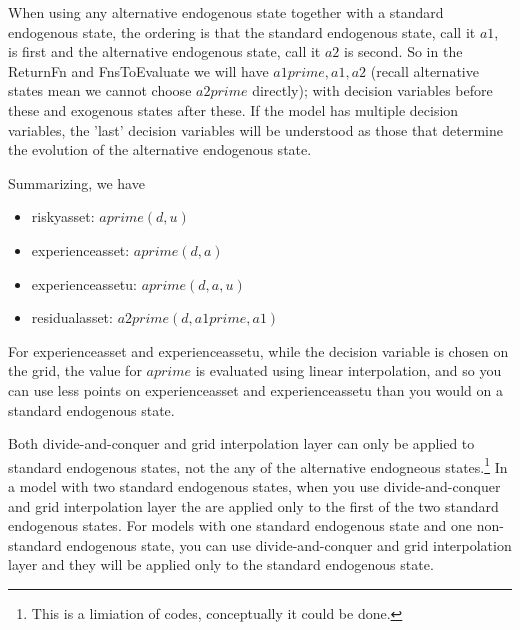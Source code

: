 When using any alternative endogenous state together with a standard endogenous state, the ordering is that the standard endogenous state, call it $a1$, is first and the alternative endogenous state, call it $a2$ is second. So in the ReturnFn and FnsToEvaluate we will have $a1prime,a1,a2$ (recall alternative states mean we cannot choose $a2prime$ directly); with decision variables before these and exogenous states after these. If the model has multiple decision variables, the 'last' decision variables will be understood as those that determine the evolution of the alternative endogenous state.


Summarizing, we have
\begin{itemize}
 \item riskyasset: $aprime(d,u)$
 \item experienceasset: $aprime(d,a)$
 \item experienceassetu: $aprime(d,a,u)$
 \item residualasset: $a2prime(d,a1prime,a1)$
\end{itemize}

For experienceasset and experienceassetu, while the decision variable is chosen on the grid, the value for $aprime$ is evaluated using linear interpolation, and so you can use less points on experienceasset and experienceassetu than you would on a standard endogenous state.

Both divide-and-conquer and grid interpolation layer can only be applied to standard endogenous states, not the any of the alternative endogneous states.\footnote{This is a limiation of codes, conceptually it could be done.} In a model with two standard endogenous states, when you use divide-and-conquer and grid interpolation layer the are applied only to the first of the two standard endogenous states. For models with one standard endogenous state and one non-standard endogenous state, you can use divide-and-conquer and grid interpolation layer and they will be applied only to the standard endogenous state.


